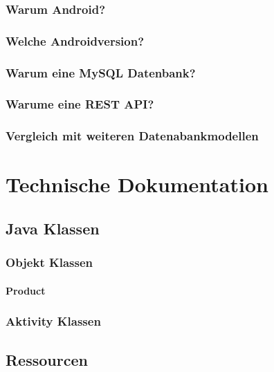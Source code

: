 \documentclass{scrartcl}
\begin{document}
\subsubsection{Warum Android?}

\subsubsection{Welche Androidversion?}

\subsubsection{Warum eine MySQL Datenbank?}

\subsubsection{Warume eine REST API?}

\subsubsection{Vergleich mit weiteren Datenabankmodellen}

\newpage

\section{Technische Dokumentation}

\subsection{Java Klassen}

\subsubsection{Objekt Klassen}

\paragraph{Product}

\subsubsection{Aktivity Klassen}

\subsection{Ressourcen}
\end{document}
